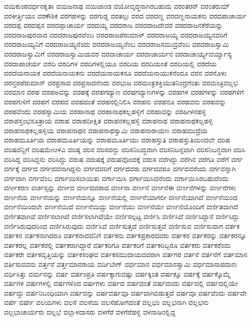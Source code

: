 {ವಯಿಕುಂಠವರ್ಧನಕೃತಾ
ವಯಿಜನಾಥ
ವಯಿಜಾಂಡ
ವಯೋವೃದ್ಧನಾಗಿರಬಹುದು
ವರಂತರನ್
ವರಂತರುಮ್
ವರಕೀರ್ತ್ತಿಯಂ
ವರಕೌಶಿಕ
ವರಗಹಳನ್ನು
ವರಗುಡ್ಡ
ವರತಲ್ಪಃ
ವರದ
ವರದಣ್ಣ
ವರದಣ್ಣನಾಯಕನು
ವರದಪಾಚಾರ್ಯ
ವರದಪ್ಪ
ವರದಪ್ಪನ
ವರದಪ್ಪಾಚಾರ್ಯ
ವರದಯ್ಯ
ವರದರಾಜ
ವರದರಾಜದೇವರ
ವರದರಾಜನಕೆರೆಯನ್ನು
ವರದರಾಜಪುರವಾದ
ವರದರಾಜಪುರವೆಂಬ
ವರದರಾಜಪೆರುಮಾಳ್
ವರದರಾಜಯ್ಯ
ವರದರಾಜಯ್ಯನವರಿಗೆ
ವರದರಾಜಯ್ಯನಿಗೆ
ವರದರಾಜಯ್ಯನೆಂದು
ವರದರಾಜಯ್ಯನೆಂಬ
ವರದರಾಜಸಮುದ್ರವೆಂಬ
ವರದರಾಜಸ್ವಾಮಿ
ವರದರಾಜಸ್ವಾಮಿಗೆ
ವರದರಾಜಸ್ವಾಮಿಯವರ
ವರದಾಚಾರ್ಯ
ವರದಾಚಾರ್ಯನ
ವರದಾಚಾರ್ಯ್ಯವರ್ಯ್ಯಾಸ್ಯ
ವರದಾಪಾಚರ್ಯ
ವರದಿ
ವರದಿಗಳ
ವರದಿಗಳಲ್ಲಿಯೂ
ವರದಿಯ
ವರದಿಯಂತೆ
ವರದಿಯಲ್ಲಿ
ವರದೆಯ
ವರದೆಯನಾಯಕ
ವರದೆಯನಾಯಕನು
ವರದೆಯನಾಯಕನೂ
ವರದೆಯನಾಯುಕನೆಂದೂ
ವರನ
ವರನೊಳು
ವರನ್ತರಪೆರುಮಾನ್
ವರಪ್ರಸಾದ
ವರಪ್ರಸಾದನೆಂದು
ವರಭುಜ
ವರಮಂತ್ರಶಕ್ತಿಯುತನಿಂದ್ರಗೆಂತು
ವರಮಂತ್ರಿವಲ್ಲಭ
ವರಮಾನ
ವರಹ
ವರಹಅವನ್ನು
ವರಹಕ್ಕೆ
ವರಹಗದ್ಯಾಣ
ವರಹಗದ್ಯಾಣಗಳನ್ನು
ವರಹಗಳ
ವರಹಗಳನ್ನು
ವರಹಗಳಿಗೆ
ವರಹಗುಳಿಗೆ
ವರಹಗೆ
ವರಹದ
ವರಹದಂತೆ
ವರಹನಲ್ಲಿನಿಲಿಸಿ
ವರಹನು
ವರಹನೂ
ವರಹವನು
ವರಹವನ್ನು
ವರಹವೆಂದು
ವರಹಸ್ವಾಮಿಯ
ವರಹಾನಾಥ
ವರಹಾನಾಥಕಲ್ಲಹಳ್ಳಿಗೆ
ವರಹಾವನ್ನು
ವರಹೀಳನಹಳ್ಳಿ
ವರಾಪಸ್ತಂಭಸೂತ್ರಾಯ
ವರಾಹ
ವರಾಹದೀಕ್ಷಿತ
ವರಾಹನಕಲ್ಲಹಳ್ಳಿ
ವರಾಹನಾಥ
ವರಾಹನಾಥಕಲ್ಲಹಳ್ಳಿ
ವರಾಹನಾಥಕಲ್ಲಹಳ್ಳಿಯ
ವರಾಹನಾಥನ
ವರಾಹನಾಥಸ್ವಾಮಿ
ವರಾಹನಾರಾಯಣ
ವರಾಹಮುದ್ರೆಯ
ವರಾಹಮೂರ್ತಿಯ
ವರಾಹಮೂರ್ತಿಯನ್ನು
ವರಾಹಮೂರ್ತಿಯು
ವರಾಹಸ್ತುತಿ
ವರಾಹಸ್ತುತಿಯಿಂದಲೇ
ವರಿಷ
ವರಿಷದನ್ದಿಗೆ
ವರಿಷಮೇೞಳವಿ
ವರಿಷ್ಠ
ವರಿಸ
ವರಿಸದನ್ದು
ವರಿಸನಿಬದ್ಧವಾಗಿ
ವರಿಸನಿಬನ್ದವಾಗಿ
ವರಿಸನಿಬನ್ಧವಾಗಿ
ವರಿಸಿ
ವರಿಸಿದ್ದ
ವರಿಸಿದ್ದನು
ವರಿಸಿದ್ದು
ವರುಷ
ವರುಷಕ್ಕೆ
ವರುಷವೊಂದಕ್ಕೆ
ವರುಸ
ವರೆಗಿದ್ದು
ವರೆಗಿನ
ವರೆಗೂ
ವರೆಗೆ
ವರ್ಗ
ವರ್ಗಕ್ಕೆ
ವರ್ಗದ
ವರ್ಗದವನಾಗಿದ್ದನು
ವರ್ಗದವರಿಗೆ
ವರ್ಗದವರು
ವರ್ಗದವರೂ
ವರ್ಗದವರೆಂದು
ವರ್ಗವನ್ನಾಗಿ
ವರ್ಗವಾಗಿ
ವರ್ಗವೆಂಬ
ವರ್ಗಾಯಿಸಲಾಯಿತು
ವರ್ಗಾಯಿಸಿ
ವರ್ಗಾಯಿಸಿದನೆಂದು
ವರ್ಗಾಯಿಸಿರಬಹುದೆಂದು
ವರ್ಗೀಕರಣ
ವರ್ಚಸ್ಸನ್ನು
ವರ್ಣದ
ವರ್ಣದವರಾದ
ವರ್ಣನಾ
ವರ್ಣನೆ
ವರ್ಣನೆಈ
ವರ್ಣನೆಗಳನ್ನು
ವರ್ಣನೆಗಳು
ವರ್ಣನೆಯ
ವರ್ಣನೆಯನ್ನು
ವರ್ಣನೆಯನ್ನೂ
ವರ್ಣನೆಯಲ್ಲಿ
ವರ್ಣನೆಯಾಗಲೀ
ವರ್ಣನೆಯಾಗಿದೆ
ವರ್ಣನೆಯಿಂದ
ವರ್ಣನೆಯಿಂದಲೇ
ವರ್ಣನೆಯಿದೆ
ವರ್ಣನೆಯಿದ್ದು
ವರ್ಣನೆಯು
ವರ್ಣನೆಯೇ
ವರ್ಣನೆಯೊಂದಿಗೆ
ವರ್ಣಿತವಾಗಿದೆ
ವರ್ಣಿತವಾಗಿವೆ
ವರ್ಣಿಸಲಾಗಿದೆ
ವರ್ಣಿಸಲಾಗಿದೆಯೇ
ವರ್ಣಿಸಲ್ಪಟ್ಟ
ವರ್ಣಿಸಿ
ವರ್ಣಿಸಿದೆ
ವರ್ಣಿಸಿದ್ದಾನೆ
ವರ್ಣಿಸಿದ್ದು
ವರ್ಣಿಸಿರುವುದರಿಂದ
ವರ್ಣಿಸಿರುವುದು
ವರ್ಣಿಸಿವೆ
ವರ್ಣಿಸುತ್ತದೆ
ವರ್ಣಿಸುತ್ತವೆ
ವರ್ಣಿಸುವ
ವರ್ಣಿಸುವಾಗ
ವರ್ತಕ
ವರ್ತಕನ
ವರ್ತಕನಾಗಿದರೂ
ವರ್ತಕನಾದವನಿಗೆ
ವರ್ತಕನು
ವರ್ತಕಪ್ರಕಾರದವರು
ವರ್ತಕರ
ವರ್ತಕರನ್ನು
ವರ್ತಕರನ್ನೂ
ವರ್ತಕರಲ್ಲ
ವರ್ತಕರಲ್ಲಿ
ವರ್ತಕರಾಗಿದ್ದಾರೆ
ವರ್ತಕರಿಗೂ
ವರ್ತಕರಿಗೆ
ವರ್ತಕರಿಬ್ಬರೂ
ವರ್ತಕರು
ವರ್ತಕರೆಂದು
ವರ್ತಕರೇ
ವರ್ತಕವೃತ್ತಿಯನ್ನು
ವರ್ತಕಸಂಘದ
ವರ್ತಕಸಮುದಾಯದವರಾಗಿ
ವರ್ತಗರ
ವರ್ತನೆ
ವರ್ತನೆಗೆ
ವರ್ತಮಾನ
ವರ್ತಿಸುವವನು
ವರ್ತ್ತನೆ
ವರ್ತ್ತಮಾನರಾಯ
ವರ್ದಿಬೇಗ್
ವರ್ಧಮಾನ
ವರ್ಧಮಾನಸ್ವಾಮಿ
ವರ್ಧಮಾನಾಪದಾನಃ
ವರ್ಧಿಸಿತ್ತು
ವರ್ಮನನ್ನು
ವರ್ಷ
ವರ್ಷಂಪ್ರತಿ
ವರ್ಷಕ್ಕಾಗುವಷ್ಟು
ವರ್ಷಕ್ಕಿಂತ
ವರ್ಷಕ್ಕೂ
ವರ್ಷಕ್ಕೆ
ವರ್ಷಕ್ಕೊಮ್ಮೆ
ವರ್ಷಗಳ
ವರ್ಷಗಳಲ್ಲಿ
ವರ್ಷಗಳಿಂದ
ವರ್ಷಗಳು
ವರ್ಷದ
ವರ್ಷದಂತೆ
ವರ್ಷದಂದು
ವರ್ಷದಲ್ಲಿ
ವರ್ಷದಲ್ಲಿಯೇ
ವರ್ಷದ್ದು
ವರ್ಷನಿಬಂಧಿಯಾಗಿ
ವರ್ಷವನ್ನು
ವರ್ಷವರ್ಷವೂ
ವರ್ಷವಾಗಿಬಿಡುತ್ತದೆ
ವರ್ಷವೂ
ವರ್ಷವೆಂದು
ವರ್ಷವೇ
ವರ್ಷೆ
ವರ್ಷೇ
ವಲಯಗಳು
ವಲಸೆ
ವಲಸೆಯ
ವಲಸೆಹೋಗದಂತೆ
ವಲ್ಲಭಂ
ವಲ್ಲಭನಾಗಿ
ವಲ್ಲಭನು
ವಲ್ಲಭಾಚಾರ್ಯರು
ವಲ್ಲಭೆ
ವಲ್ಲಾಳದಾಸರು
ವಳಗೆರೆ
ವಳಗೆರೆಹಳ್ಳಿ
ವಳನಾಡಿನಲ್ಲಿದ್ದ
}
